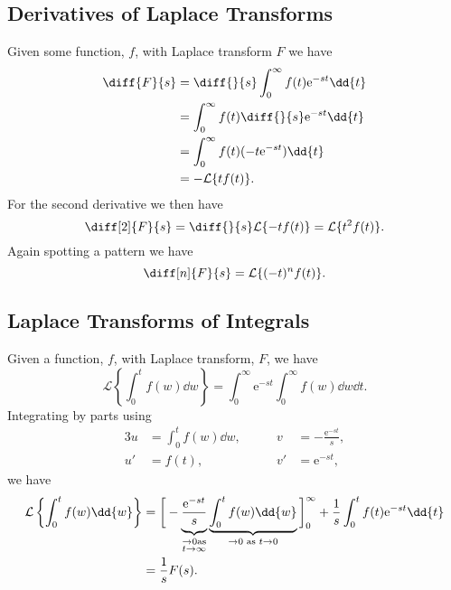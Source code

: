 \documentclass[fleqn]{NotesClass}
\newcommand*{\e}{\mathrm{e}}
\newcommand*{\laplaceTransform}{\mathcal{L}}
\begin{document}
    \subsection{Derivatives of Laplace Transforms}
    Given some function, \(f\), with Laplace transform \(F\) we have
    \begin{align}
        \diff{F}{s} &= \diff{}{s} \int_{0}^{\infty} f(t) \e^{-st} \dd{t}\\
        &= \int_{0}^{\infty} f(t) \diff{}{s} \e^{-st} \dd{t}\\
        &= \int_{0}^{\infty} f(t)(-t\e^{-st})\dd{t}\\
        &= -\laplaceTransform\{ tf(t) \}.
    \end{align}
    For the second derivative we then have
    \begin{equation}
        \diff[2]{F}{s} = \diff{}{s}\laplaceTransform\{ -tf(t) \} = \laplaceTransform\{ t^2f(t) \}.
    \end{equation}
    Again spotting a pattern we have
    \begin{equation}
        \diff[n]{F}{s} = \laplaceTransform\{ (-t)^nf(t) \}.
    \end{equation}
    
    \subsection{Laplace Transforms of Integrals}
    Given a function, \(f\), with Laplace transform, \(F\), we have
    \begin{equation}
        \laplaceTransform\left\{ \int_{0}^{t} f(w) \dd{w} \right\} = \int_{0}^{\infty} \e^{-st} \int_{0}^{\infty} f(w) \dd{w} \dd{t}.
    \end{equation}
    Integrating by parts using
    \begin{alignat}{3}
        u &= \int_{0}^{t}f(w)\dd{w}, \qquad & v &= -\frac{\e^{-st}}{s},\\
        u' &= f(t), \qquad & v' &= \e^{-st},
    \end{alignat}
    we have
    \begin{align}
        \laplaceTransform\left\{ \int_{0}^{t} f(w) \dd{w} \right\} &= \bigg[ -\underbrace{\vphantom{\int_{0}^{t}}\frac{\e^{-st}}{s}}_{\substack{\to 0\text{as}\\ t \to \infty}} \underbrace{\int_{0}^{t} f(w) \dd{w}}_{\to 0 \text{ as } t \to 0} \bigg]_{0}^{\infty} + \frac{1}{s} \int_{0}^{t} f(t) \e^{-st} \dd{t}\\
        &= \frac{1}{s}F(s).
    \end{align}
    
\end{document}
